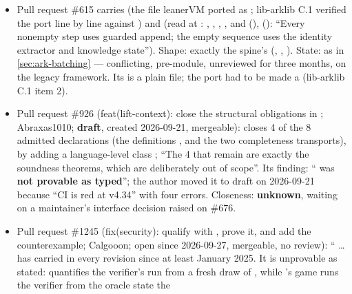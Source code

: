\begin{itemize}
\item Pull request \#615 carries
   (the file leanerVM
  ported as ; lib-arklib C.1 verified the port line by line
  against ) and  (read at :
  , , , ,
  and  (),
   ():
  ``Every nonempty step uses guarded append; the empty sequence uses the identity extractor and
  knowledge state''). Shape: exactly the spine's (,
  , ). State: as in
  \cref{sec:ark-batching} --- conflicting, pre-module, unreviewed for three months, on the legacy
  framework. Its  is a plain  file; the port had to be
  made a  (lib-arklib C.1 item 2).
\item Pull request \#926 (feat(lift-context): close the structural obligations in
  ; Abraxas1010; \textbf{draft}, created 2026-09-21, mergeable):
  closes 4 of the 8 admitted declarations (the definitions
  ,  and the
  two completeness transports), by adding a language-level class
  ; ``The 4 that remain are exactly the 
  soundness theorems, which are deliberately out of scope''. Its finding:
  `` was \textbf{not provable as typed}''; the author
  moved it to draft on 2026-09-21 because ``CI is red at v4.34'' with four errors. Closeness:
  \textbf{unknown}, waiting on a maintainer's interface decision raised on \#676.
\item Pull request \#1245 (fix(security): qualify  with
  \code{[Subsingleton σ]}, prove it, and add the counterexample; Calgooon; open since
  2026-09-27, mergeable, no review): `` \ldots{}
  has carried  in every revision since at least January 2025. It is unprovable as
  stated:  quantifies the verifier's run from a fresh draw of
  , while 's game runs the verifier from the oracle state the

\end{itemize}
